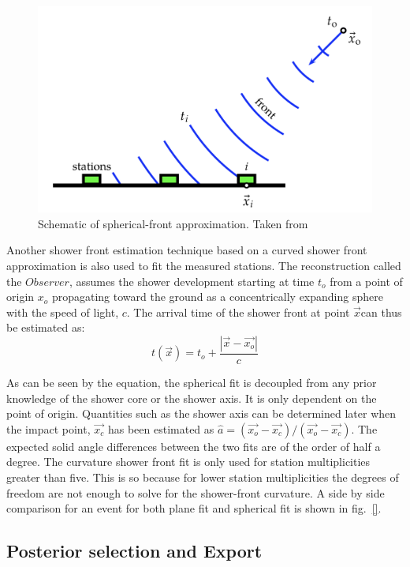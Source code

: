 \begin{figure}[h!]
  \centering
  \includegraphics[width=\textwidth]{thesis_figures/Nu_analysis/Spherical_fit.png}
  \caption{Schematic of spherical-front approximation. Taken from~\cite{PierreAuger:2020yab}}
  \label{fig:Spherical_fit}
\end{figure}

Another shower front estimation technique based on a curved shower front approximation is also used to fit the measured stations. The reconstruction called the $Observer$, assumes the shower development starting at time $t_o$ from a point of origin $x_o$ propagating toward the ground as a concentrically expanding sphere with the speed of light, $c$. The arrival time of the shower front at point $\vec{x}$can thus be estimated as:
\begin{equation}
  t(\vec{x}) = t_o + \frac{|\vec{x}-\vec{x_o}|}{c}
\end{equation}

As can be seen by the equation, the spherical fit is decoupled from any prior knowledge of the shower core or the shower axis. It is only dependent on the point of origin. Quantities such as the shower axis can be determined later when the impact point, $\vec{x_c}$ has been estimated as $ \hat{a} = (\vec{x_o} -\vec{x_c})/ (\vec{x_o}-\vec{x_c})$. The expected solid angle differences between the two fits are of the order of half a degree. The curvature shower front fit is only used for station multiplicities greater than five. This is so because for lower station multiplicities the degrees of freedom are not enough to solve for the shower-front curvature. A side by side comparison for an event for both plane fit and spherical fit is shown in fig.~\ref{}.

\subsection{Posterior selection and Export}
\label{subsec:reco_possel}

